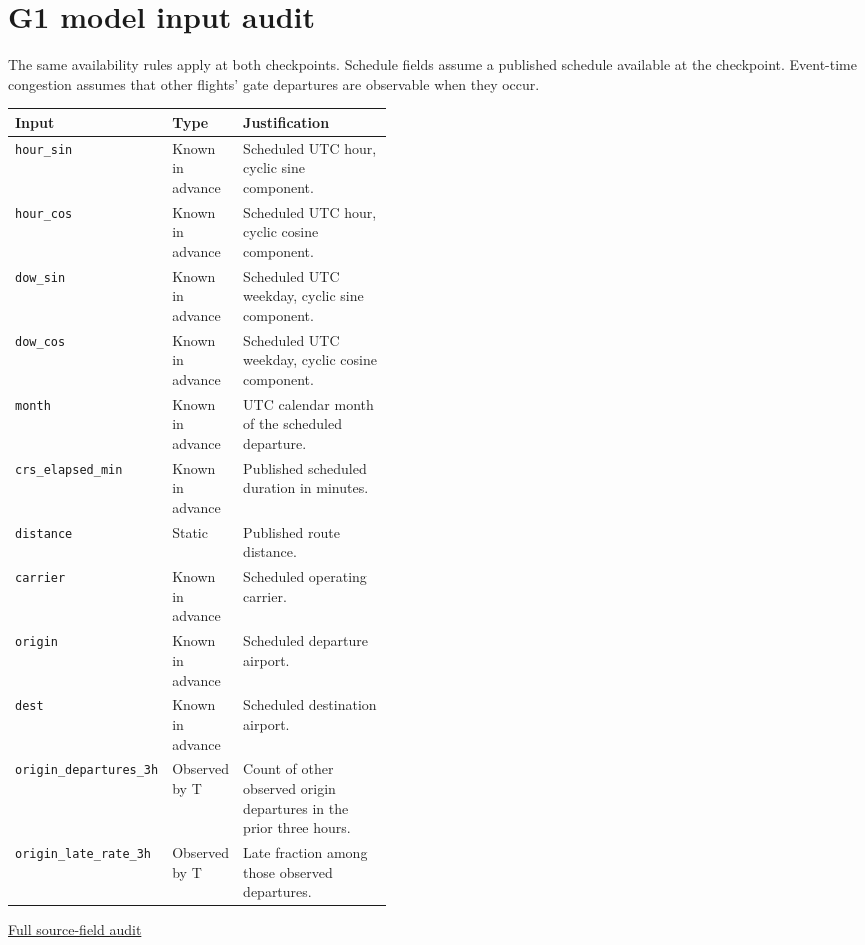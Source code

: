 \documentclass{article}
\begin{document}
\section{G1 model input audit}
The same availability rules apply at both checkpoints. Schedule fields assume a published schedule available at the checkpoint. Event-time congestion assumes that other flights' gate departures are observable when they occur.
\begin{center}\small\begin{tabular}{@{}llp{0.44\linewidth}@{}}\toprule
Input & Type & Justification \\\midrule
\texttt{hour\_sin} & Known in advance & Scheduled UTC hour, cyclic sine component. \\
\texttt{hour\_cos} & Known in advance & Scheduled UTC hour, cyclic cosine component. \\
\texttt{dow\_sin} & Known in advance & Scheduled UTC weekday, cyclic sine component. \\
\texttt{dow\_cos} & Known in advance & Scheduled UTC weekday, cyclic cosine component. \\
\texttt{month} & Known in advance & UTC calendar month of the scheduled departure. \\
\texttt{crs\_elapsed\_min} & Known in advance & Published scheduled duration in minutes. \\
\texttt{distance} & Static & Published route distance. \\
\texttt{carrier} & Known in advance & Scheduled operating carrier. \\
\texttt{origin} & Known in advance & Scheduled departure airport. \\
\texttt{dest} & Known in advance & Scheduled destination airport. \\
\texttt{origin\_departures\_3h} & Observed by T & Count of other observed origin departures in the prior three hours. \\
\texttt{origin\_late\_rate\_3h} & Observed by T & Late fraction among those observed departures. \\
\bottomrule\end{tabular}\end{center}
\href{https://github.com/oki-dokii/Flight-Departure-Delay-Prediction-/blob/main/COLUMN_AUDIT.csv}{Full source-field audit}
\end{document}
